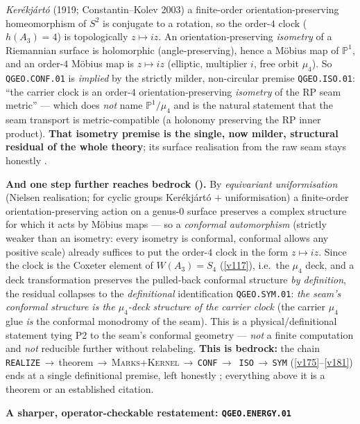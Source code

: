 \documentclass[11pt,a4paper]{article}
\newcommand{\PP}{\mathbb P^1}
\begin{document}
\begin{keybox}
\emph{Ker\'ekj\'art\'o} (1919; Constantin--Kolev 2003) a finite-order orientation-preserving
homeomorphism of $S^2$ is conjugate to a rotation, so the order-$4$ clock ($h(A_3){=}4$) is
topologically $z\mapsto iz$. An orientation-preserving \emph{isometry} of a Riemannian surface is
holomorphic (angle-preserving), hence a M\"obius map of $\PP$, and an order-$4$ M\"obius map is
$z\mapsto iz$ (elliptic, multiplier $i$, free orbit $\mu_4$). So \texttt{QGEO.CONF.01} is \emph{implied}
by the strictly milder, non-circular premise \texttt{QGEO.ISO.01}: ``the carrier clock is an order-$4$
orientation-preserving \emph{isometry} of the RP seam metric'' --- which does \emph{not} name
$\PP/\mu_4$ and is the natural statement that the seam transport is metric-compatible (a holonomy
preserving the RP inner product). \textbf{That isometry premise is the single, now milder, structural
residual of the whole theory}; its surface realisation from the raw seam stays honestly \mO.
\par\smallskip\noindent\textbf{And one step further reaches bedrock
().} By \emph{equivariant uniformisation} (Nielsen
realisation; for cyclic groups Ker\'ekj\'art\'o $+$ uniformisation) a finite-order orientation-preserving
action on a genus-$0$ surface preserves a complex structure for which it acts by M\"obius maps --- so a
\emph{conformal automorphism} (strictly weaker than an isometry: every isometry is conformal, conformal
allows any positive scale) already suffices to put the order-$4$ clock in the form $z\mapsto iz$. Since
the clock is the Coxeter element of $W(A_3)=S_4$ (\vref{v117}), i.e.\ the $\mu_4$ deck, and a deck
transformation preserves the pulled-back conformal structure \emph{by definition}, the residual
collapses to the \emph{definitional} identification \texttt{QGEO.SYM.01}: \emph{the seam's conformal
structure is the $\mu_4$-deck structure of the carrier clock} (the carrier $\mu_4$ glue \emph{is} the
conformal monodromy of the seam). This is a physical/definitional statement tying P2 to the seam's
conformal geometry --- \emph{not} a finite computation and \emph{not} reducible further without
relabeling. \textbf{This is bedrock:} the chain
\texttt{REALIZE}\,$\to$\,theorem\,$\to$\,\textsc{Marks{+}Kernel}\,$\to$\,\texttt{CONF}\,$\to$\,%
\texttt{ISO}\,$\to$\,\texttt{SYM} (\vref{v175}--\vref{v181}) ends at a single definitional premise, left
honestly \mO; everything above it is a theorem or an established citation.
\par\smallskip\noindent\textbf{A sharper, operator-checkable restatement: \texttt{QGEO.ENERGY.01}
}
\end{keybox}
\end{document}
